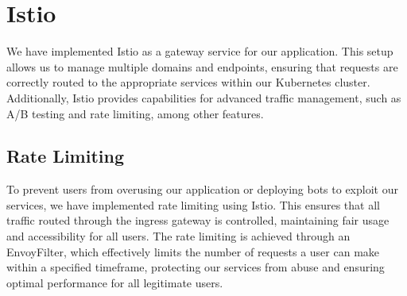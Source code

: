 \section{Istio}
We have implemented Istio as a gateway service for our application. This setup allows us to manage multiple domains and endpoints, ensuring that requests are correctly routed to the appropriate services within our Kubernetes cluster. Additionally, Istio provides capabilities for advanced traffic management, such as A/B testing and rate limiting, among other features.

\subsection{Rate Limiting} %
To prevent users from overusing our application or deploying bots to exploit our services, we have implemented rate limiting using Istio. This ensures that all traffic routed through the ingress gateway is controlled, maintaining fair usage and accessibility for all users. The rate limiting is achieved through an EnvoyFilter, which effectively limits the number of requests a user can make within a specified timeframe, protecting our services from abuse and ensuring optimal performance for all legitimate users.



